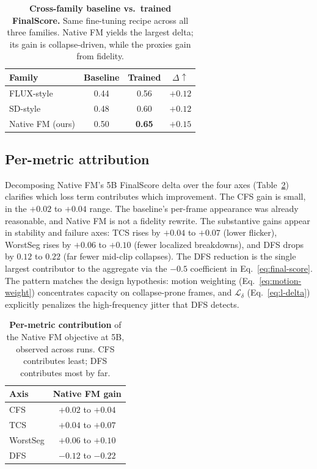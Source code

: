 \documentclass[10pt,twocolumn]{article}
\begin{document}
\begin{table}[H]
\centering
\small
\caption{\textbf{Cross-family baseline vs.\ trained FinalScore.} Same fine-tuning recipe across all three families. Native FM yields the largest delta; its gain is collapse-driven, while the proxies gain from fidelity.\label{tab:cross}}
\begin{tabular}{lccc}
\toprule
Family & Baseline & Trained & $\Delta\!\uparrow$ \\
\midrule
FLUX-style          & 0.44 & 0.56 & $+0.12$ \\
SD-style            & 0.48 & 0.60 & $+0.12$ \\
Native FM (ours)    & 0.50 & \textbf{0.65} & $\mathbf{+0.15}$ \\
\bottomrule
\end{tabular}
\end{table}

\subsection{Per-metric attribution}\label{sec:attribution}

Decomposing Native FM's 5B FinalScore delta over the four axes (Table~\ref{tab:gains}) clarifies which loss term contributes which improvement. The CFS gain is small, in the $+0.02$ to $+0.04$ range. The baseline's per-frame appearance was already reasonable, and Native FM is not a fidelity rewrite. The substantive gains appear in stability and failure axes: TCS rises by $+0.04$ to $+0.07$ (lower flicker), WorstSeg rises by $+0.06$ to $+0.10$ (fewer localized breakdowns), and DFS drops by $0.12$ to $0.22$ (far fewer mid-clip collapses). The DFS reduction is the single largest contributor to the aggregate via the $-0.5$ coefficient in Eq.~\eqref{eq:final-score}. The pattern matches the design hypothesis: motion weighting (Eq.~\eqref{eq:motion-weight}) concentrates capacity on collapse-prone frames, and $\mathcal{L}_\delta$ (Eq.~\eqref{eq:l-delta}) explicitly penalizes the high-frequency jitter that DFS detects.

\begin{table}[H]
\centering
\small
\caption{\textbf{Per-metric contribution} of the Native FM objective at 5B, observed across runs. CFS contributes least; DFS contributes most by far.\label{tab:gains}}
\begin{tabular}{lc}
\toprule
Axis & Native FM gain \\
\midrule
CFS          & $+0.02$ to $+0.04$ \\
TCS          & $+0.04$ to $+0.07$ \\
WorstSeg     & $+0.06$ to $+0.10$ \\
DFS          & $-0.12$ to $-0.22$ \\
\bottomrule
\end{tabular}
\end{table}
\end{document}
